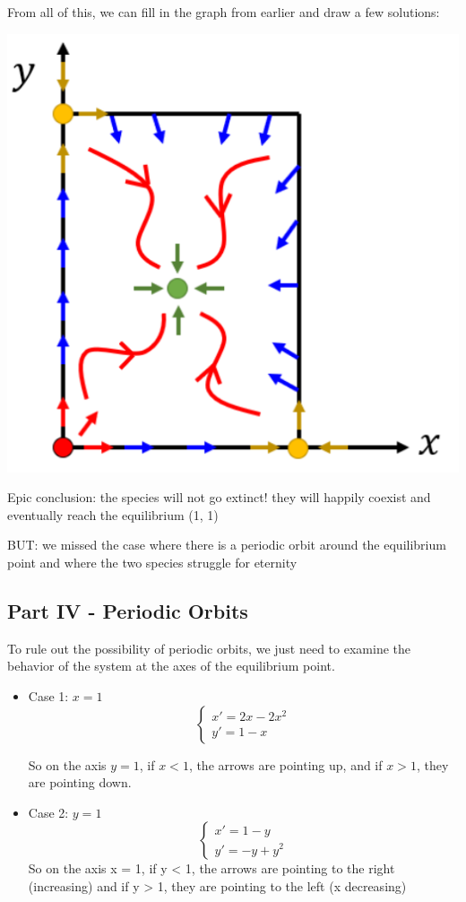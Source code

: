 \documentclass[12pt]{article}
\begin{document}
From all of this, we can fill in the graph from earlier and draw a few solutions:

\includegraphics{Images/rabbits and bunnies plot 2.png}

Epic conclusion: the species will not go extinct! they will happily coexist and eventually reach the equilibrium (1, 1)

BUT: we missed the case where there is a periodic orbit around the equilibrium point and where the two species struggle for eternity

\subsection*{Part IV - Periodic Orbits}
To rule out the possibility of periodic orbits, we just need to examine the behavior of the system at the axes of the equilibrium point.

\begin{itemize}
    \item Case 1: $x = 1$
    \[\begin{cases}
        x' = 2x - 2x^2\\
        y' = 1 - x
    \end{cases}\]

    So on the axis $y = 1$, if $x < 1$, the arrows are pointing up, and if $x > 1$, they are pointing down.

    \item Case 2: $y = 1$
    \[\begin{cases}
        x' = 1 -y\\
        y' = -y + y^2
    \end{cases}\]
    So on the axis x = 1, if y < 1, the arrows are pointing to the right (increasing) and if y > 1, they are pointing to the left (x decreasing)
\end{itemize}
\end{document}
